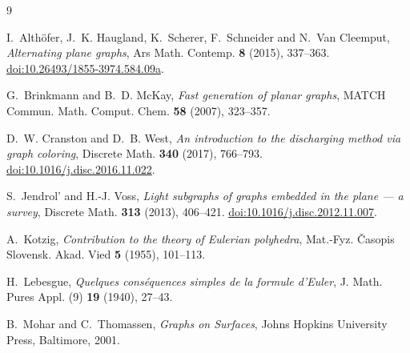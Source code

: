 \documentclass{amsart}
\theoremstyle{plain}
\theoremstyle{definition}
\theoremstyle{remark}
\begin{document}
\begin{thebibliography}{9}

I.~Alth\"ofer, J.~K. Haugland, K.~Scherer, F.~Schneider and N.~Van Cleemput,
\emph{Alternating plane graphs}, Ars Math. Contemp. \textbf{8} (2015),
337--363.
\href{https://doi.org/10.26493/1855-3974.584.09a}{doi:10.26493/1855-3974.584.09a}.

G.~Brinkmann and B.~D. McKay, \emph{Fast generation of planar graphs},
MATCH Commun. Math. Comput. Chem. \textbf{58} (2007), 323--357.

D.~W. Cranston and D.~B. West, \emph{An introduction to the discharging method
via graph coloring}, Discrete Math. \textbf{340} (2017), 766--793.
\href{https://doi.org/10.1016/j.disc.2016.11.022}{doi:10.1016/j.disc.2016.11.022}.

S.~Jendrol' and H.-J. Voss, \emph{Light subgraphs of graphs embedded in the
plane --- a survey}, Discrete Math. \textbf{313} (2013), 406--421.
\href{https://doi.org/10.1016/j.disc.2012.11.007}{doi:10.1016/j.disc.2012.11.007}.

A.~Kotzig, \emph{Contribution to the theory of Eulerian polyhedra},
Mat.-Fyz. \v{C}asopis Slovensk. Akad. Vied \textbf{5} (1955), 101--113.

H.~Lebesgue, \emph{Quelques cons\'equences simples de la formule d'Euler},
J. Math. Pures Appl. (9) \textbf{19} (1940), 27--43.

B.~Mohar and C.~Thomassen, \emph{Graphs on Surfaces}, Johns Hopkins University
Press, Baltimore, 2001.

\end{thebibliography}
\end{document}
